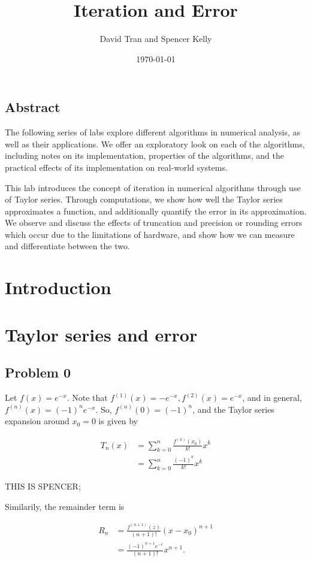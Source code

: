 \documentclass[letter,11pt]{article}
\title{Iteration and Error}
\author{David Tran and Spencer Kelly}
\date{\today}
\begin{document}
\maketitle

\subsection*{Abstract}
The following series of labs explore different algorithms in numerical analysis, as well as their applications. We offer an exploratory look on each of the algorithms, including notes on its implementation, properties of the algorithms, and the practical effects of its implementation on real-world systems.

This lab introduces the concept of iteration in numerical algorithms through use of Taylor series. Through computations, we show how well the Taylor series approximates a function, and additionally quantify the error in its approximation. We observe and discuss the effects of truncation and precision or rounding errors which occur due to the limitations of hardware, and show how we can measure and differentiate between the two.

\section{Introduction}

\section{Taylor series and error}

\setcounter{subsection}{-1}
\subsection{Problem 0}
Let $f(x) = e^{-x}$. Note that $f^{(1)}(x) = -e^{-x}, f^{(2)}(x) = e^{-x}$, and in general, $f^{(n)}(x) = (-1)^ne^{-x}$. So, $f^{(n)}(0) = (-1)^n$, and the Taylor series expansion around $x_0 = 0$ is given by

\begin{align*}
T_n(x) &= \sum_{k = 0}^n \frac{f^{(k)}(x_0)}{k!} x^k \\
&= \sum_{k = 0}^n \frac{(-1)^k}{k!}x^k
\end{align*}

THIS IS SPENCER;

Similarily, the remainder term is

\begin{align*}
R_n &= \frac{f^{(n + 1)}(z)}{(n + 1)!}(x - x_0)^{n + 1} \\
&= \frac{(-1)^{n + 1} e^{-c}}{(n + 1)!}x^{n + 1}.
\end{align*}
\end{document}
